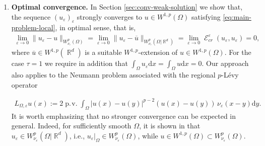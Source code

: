 \documentclass[12pt, reqno]{amsart}%
\theoremstyle{plain}  %
\theoremstyle{definition}  %
\numberwithin{equation}{section}
\DeclareMathOperator{\pv}{\operatorname{p.\!v.}}
\DeclareMathOperator{\cE}{\mathcal{E}}
\DeclareMathOperator{\R}{\mathbb{R}}
\renewcommand{\d}{\mathrm{d}}
\newcommand{\eps}{\varepsilon}
\newcommand{\WnuOmRa}{W^p_{\nu_\eps}(\Omega|\R^d )}
\newcommand{\WnuOma}{W^{p}_{\nu_\eps}(\Omega)}
\begin{document}
\begin{enumerate}[$(A)$]
\item \textbf{Optimal convergence.} In Section \ref{sec:conv-weak-solution} we show that, the sequence $(u_\eps)_\eps$ strongly converges to $u\in W^{1,p}(\Omega)$ satisfying \eqref{eq:main-problem-local}, in optimal  sense, that is,
\begin{align}\label{eq:intro-op-con}
\lim_{\eps\to0}\|u_\eps-u\|_{\WnuOma}= \lim_{\eps\to0}\|u_\eps-\overline{u}\|_{\WnuOmRa}= \lim_{\eps\to0} \cE^\eps_{cr}(u_\eps,u_\eps)=0,
\end{align}
where $\overline{u}\in W^{1,p}(\R^d)$ is a suitable $W^{1,p}$-extension of $u\in W^{1,p}(\Omega)$. For the case $\tau=1$ we require in addition that $\int_\Omega u_\eps \d x= \int_\Omega u \d x= 0$. Our approach also applies to the  Neumann problem associated with the regional $p$-L{\'e}vy operator

\begin{align*}
L_{\Omega, \eps} u(x):= 2\pv \int_\Omega |u(x)-u(y)|^{p-2}(u(x)-u(y))\, \nu_\eps(x-y)\d y.
\end{align*}
It is worth emphasizing that  no stronger convergence can be expected in general. Indeed, for sufficiently smooth $\Omega$, it is shown in \cite{Fog25} that $u_\eps \in \WnuOmRa$, i.e., $u_\eps|_\Omega\in \WnuOma$,
while $u \in W^{1,p}(\Omega)\subset \WnuOma$.


\end{enumerate}
\end{document}
